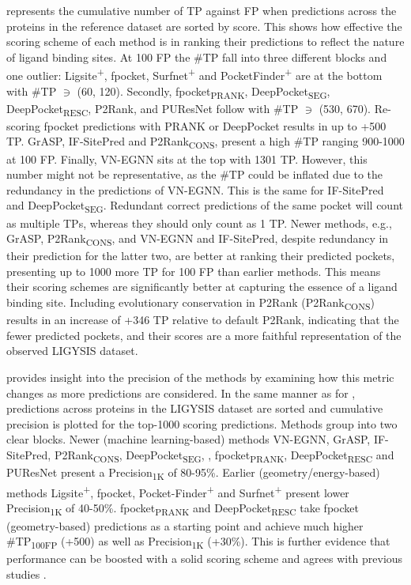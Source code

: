  represents the cumulative number of TP against FP when predictions across the proteins in the reference dataset are sorted by score. This shows how effective the scoring scheme of each method is in ranking their predictions to reflect the nature of ligand binding sites. At 100 FP the \#TP fall into three different blocks and one outlier: Ligsite\textsuperscript{+}, fpocket, Surfnet\textsuperscript{+} and PocketFinder\textsuperscript{+} are at the bottom with \#TP $\ni$ (60, 120). Secondly, fpocket\textsubscript{PRANK}, DeepPocket\textsubscript{SEG}, DeepPocket\textsubscript{RESC}, P2Rank, and PUResNet follow with \#TP $\ni$ (530, 670). Re-scoring fpocket predictions with PRANK or DeepPocket results in up to +500 TP. GrASP, IF-SitePred and P2Rank\textsubscript{CONS}, present a high \#TP ranging 900-1000 at 100 FP. Finally, VN-EGNN sits at the top with 1301 TP. However, this number might not be representative, as the \#TP could be inflated due to the redundancy in the predictions of VN-EGNN. This is the same for IF-SitePred and DeepPocket\textsubscript{SEG}. Redundant correct predictions of the same pocket will count as multiple TPs, whereas they should only count as 1 TP. Newer methods, e.g., GrASP, P2Rank\textsubscript{CONS}, and VN-EGNN and IF-SitePred, despite redundancy in their prediction for the latter two, are better at ranking their predicted pockets, presenting up to 1000 more TP for 100 FP than earlier methods. This means their scoring schemes are significantly better at capturing the essence of a ligand binding site. Including evolutionary conservation in P2Rank (P2Rank\textsubscript{CONS}) results in an increase of +346 TP relative to default P2Rank, indicating that the fewer predicted pockets, and their scores are a more faithful representation of the observed LIGYSIS dataset.

 provides insight into the precision of the methods by examining how this metric changes as more predictions are considered. In the same manner as for , predictions across proteins in the LIGYSIS dataset are sorted and cumulative precision is plotted for the top-1000 scoring predictions. Methods group into two clear blocks. Newer (machine learning-based) methods VN-EGNN, GrASP, IF-SitePred, P2Rank\textsubscript{CONS}, DeepPocket\textsubscript{SEG}, , fpocket\textsubscript{PRANK}, DeepPocket\textsubscript{RESC} and PUResNet present a Precision\textsubscript{1K} of 80-95\%. Earlier (geometry/energy-based) methods Ligsite\textsuperscript{+}, fpocket, Pocket-Finder\textsuperscript{+} and Surfnet\textsuperscript{+} present lower Precision\textsubscript{1K} of 40-50\%. fpocket\textsubscript{PRANK} and DeepPocket\textsubscript{RESC} take fpocket (geometry-based) predictions as a starting point and achieve much higher \#TP\textsubscript{100FP} (+500) as well as Precision\textsubscript{1K} (+30\%). This is further evidence that performance can be boosted with a solid scoring scheme and agrees with previous studies \cite{KRIVAK_2015_PRANK, KRIVAK_2015_P2RANK, KRIVAK_2018_P2RANK, COMAJUNCOSA_2024_POCKETS}.

